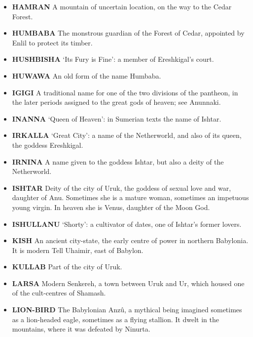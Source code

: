 \documentclass{article}
\begin{document}
\begin{multicols}{3}
\begin{small}
\begin{itemize}[
        label=,
        leftmargin=1.0em,
        itemindent=-1.0em,
        nosep,
    ]
    \item \textbf{HAMRAN}
    A mountain of uncertain location, on the way to the Cedar Forest.

    \item \textbf{HUMBABA}
    The monstrous guardian of the Forest of Cedar, appointed by Enlil to
    protect its timber.

    \item \textbf{HUSHBISHA}
    `Its Fury is Fine': a member of Ereshkigal's court.

    \item \textbf{HUWAWA}
    An old form of the name Humbaba.

    \item \textbf{IGIGI}
    A traditional name for one of the two divisions of the pantheon, in the
    later periods assigned to the great gods of heaven; see Anunnaki.

    \item \textbf{INANNA}
    `Queen of Heaven':
    in Sumerian texts the name of Ishtar.

    \item \textbf{IRKALLA}
    `Great City': a name of the Netherworld, and also of its queen, the
    goddess Ereshkigal.

    \item \textbf{IRNINA}
    A name given to the goddess Ishtar, but also a deity of the Netherworld.

    \item \textbf{ISHTAR}
    Deity of the city of Uruk, the goddess of sexual love and war, daughter
    of Anu. Sometimes she is a mature woman, sometimes an impetuous young
    virgin. In heaven she is Venus, daughter of the Moon God.

    \item \textbf{ISHULLANU}
    `Shorty': a cultivator of dates, one of Ishtar's former lovers.

    \item \textbf{KISH}
    An ancient city-state, the early centre of power in northern Babylonia.
    It is modern Tell Uhaimir, east of Babylon.

    \item \textbf{KULLAB}
    Part of the city of Uruk.

    \item \textbf{LARSA}
    Modern Senkereh, a town between Uruk and Ur, which housed one of the
    cult-centres of Shamash.

    \item \textbf{LION-BIRD}
    The Babylonian Anzû, a mythical being imagined sometimes as a
    lion-headed eagle, sometimes as a flying stallion. It dwelt in the
    mountains, where it was defeated by Ninurta.


\end{itemize}
\end{small}
\end{multicols}
\end{document}
